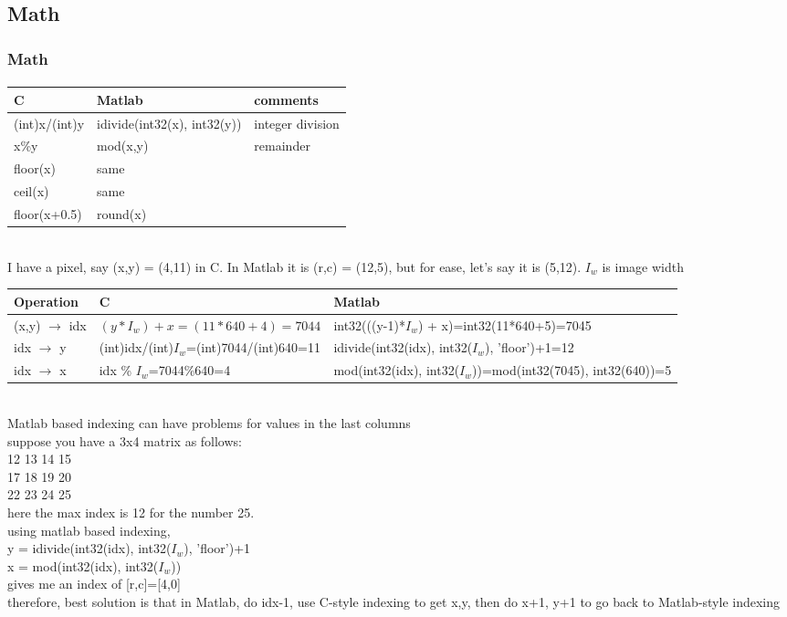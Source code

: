\subsection{Math}
\begin{frame}[plain]
\frametitle{Math}
\framesubtitle{}
\logoCSIPCPL\mypagenum
\tiny
\begin{changemargin}{-1.43in}{0in}
\begin{tabular}{|l|l|l|}
\hline
C 						& Matlab 						& comments  \\ 
\hline
(int)x/(int)y 			& idivide(int32(x), int32(y)) 	& integer division\\
x\%y 					& mod(x,y) 					& remainder\\
\hline
floor(x) 				& same 						&\\
ceil(x) 					& same				 			&\\
floor(x+0.5) 			& round(x) 					&\\
\hline
\end{tabular}\\
I have a pixel, say (x,y) = (4,11) in C.  In Matlab it is (r,c) = (12,5), but for ease, let's say it is (5,12).  $I_w$ is image width\\
\begin{tabular}{|l|l|l|}
\hline
Operation 						& C 											& Matlab  \\ 
\hline
(x,y) $\rightarrow$ idx 		& $(y*I_w) + x = (11*640+4)=7044$ 		&  int32(((y-1)*$I_w$) + x)=int32(11*640+5)=7045\\
idx $\rightarrow$ y 			& (int)idx/(int)$I_w$=(int)7044/(int)640=11 	&  idivide(int32(idx), int32($I_w$), 'floor')+1=12\\
idx $\rightarrow$ x 			& idx \% $I_w$=7044\%640=4 				&  mod(int32(idx), int32($I_w$))=mod(int32(7045), int32(640))=5 \\
\hline
\end{tabular}\\
Matlab based indexing can have problems for values in the last columns\\
suppose you have a 3x4 matrix as follows:\\
    12    13    14    15\\
    17    18    19    20\\
    22    23    24    25\\
here the max index is 12 for the number 25.\\
using matlab based indexing, \\
y = idivide(int32(idx), int32($I_w$), 'floor')+1\\
x = mod(int32(idx), int32($I_w$))\\
gives me an index of [r,c]=[4,0]\\
therefore, best solution is that in Matlab, do idx-1, use C-style indexing to get x,y, then do x+1, y+1 to go back to Matlab-style indexing
\end{changemargin}
\end{frame}



